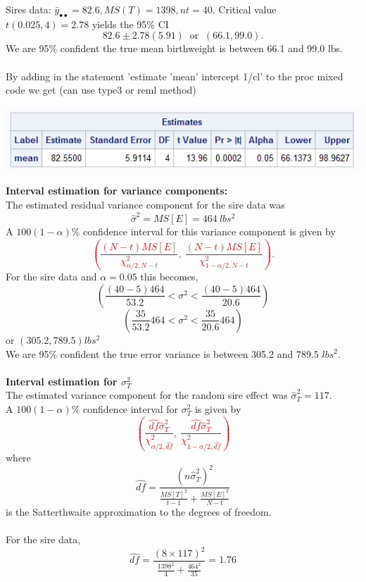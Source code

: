 Sires data: $\bar{y}_{\bullet\bullet}=82.6, MS(T)=1398, nt=40.$ 
Critical value $t(0.025,4)=2.78$ yields the 95\% CI
$$82.6 \pm 2.78 (5.91) \ \mbox{ or } \ (66.1,99.0).$$
We are 95\% confident the true mean birthweight is between 66.1 and 99.0 lbs.\\~\\
By adding in the statement 'estimate 'mean' intercept 1/cl' to the proc mixed code we get (can use type3 or reml method)
\begin{center}
\includegraphics[scale=0.8]{Sire3}
\end{center}\newpage

\textbf{Interval estimation for variance components:}\\
The estimated residual variance component for the sire data was
$$\hat\sigma^2 = MS[E] = 464~lbs^2$$ 
A $100(1-\alpha)\%$ confidence interval for this variance component is given by 
\textcolor{red}{$$ \left(\frac{(N-t)MS[E]}{\chi^2_{\alpha/2,N-t}}, \ \frac{(N-t)MS[E]}{\chi^2_{1-\alpha/2,N-t}}\right).$$ }
For the sire data and $\alpha=0.05$ this becomes,
$$\left(\frac{(40-5)464}{53.2} < \sigma^2 < \frac{(40-5)464}{20.6}\right) $$
$$\left(\frac{35}{53.2}464 < \sigma^2 < \frac{35}{20.6}464\right)$$
or $(305.2,789.5) lbs^2$\\
We are 95\% confident the true error variance is between 305.2 and 789.5 $lbs^2$.\\~\\

\textbf{Interval estimation for $\sigma_T^2$}\\
The estimated variance component for the random sire effect was $\hat\sigma_T^2 = 117$.\\
A $100(1-\alpha)\%$ confidence interval for $\sigma^2_T$ is given by 
\textcolor{red}{$$ \left(\frac{\widehat{df}\hat\sigma_T^2}{\chi^2_{\alpha/2,\widehat{df}}}, \ \frac{\widehat{df}\hat\sigma_T^2}{\chi^2_{1-\alpha/2,\widehat{df}}}\right)$$}
where 
$$\widehat{df} = \frac{(n \hat\sigma_T^2)^2}{\frac{MS[T]^2}{t-1} + \frac{MS[E]^2}{N-t}}$$
is the Satterthwaite approximation to the degrees of freedom.\\~\\
For the sire data,
$$ \widehat{df} = \frac{(8 \times 117)^2}{\frac{1398^2}{4}+\frac{464^2}{35}} = 1.76$$

